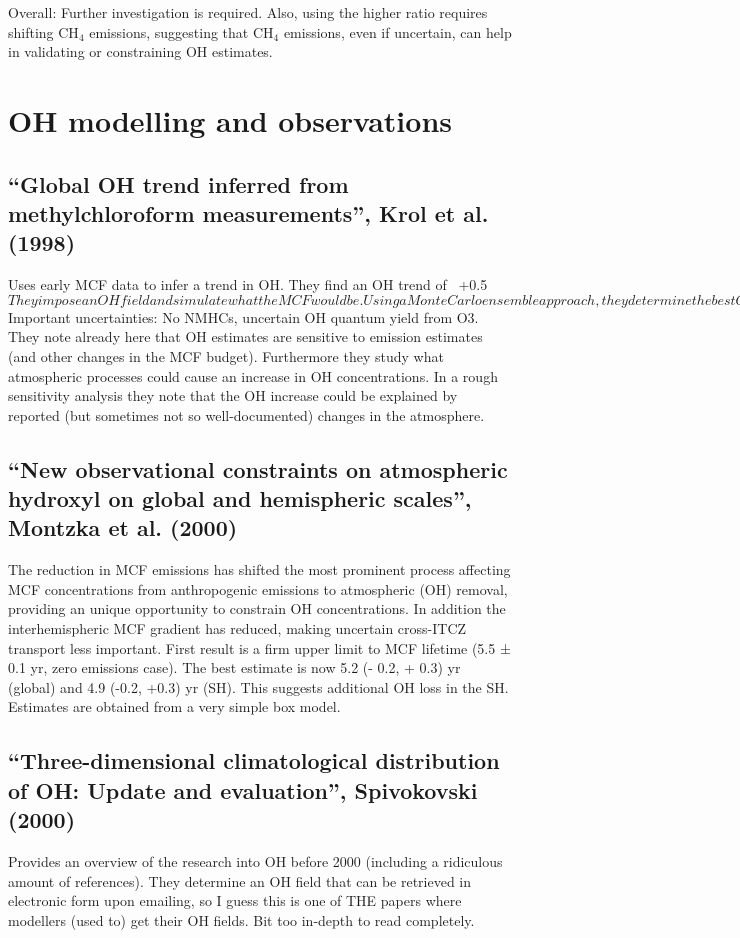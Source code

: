 Overall: Further investigation is required. Also, using the higher ratio requires shifting CH$_4$ emissions, suggesting that CH$_4$ emissions, even if uncertain, can help in validating or constraining OH estimates.

\section{OH modelling and observations}

\subsection{“Global OH trend inferred from methylchloroform measurements”, Krol et al. (1998)}
Uses early MCF data to infer a trend in OH. They find an OH trend of ~+0.5$%
They impose an OH field and simulate what the MCF would be. Using a Monte Carlo ensemble approach, they determine the best OH field. NOTE: Typical uncertainties in the generated OH field can be up to 25$%
Important uncertainties: No NMHCs, uncertain OH quantum yield from O3.
They note already here that OH estimates are sensitive to emission estimates (and other changes in the MCF budget). Furthermore they study what atmospheric processes could cause an increase in OH concentrations. In a rough sensitivity analysis they note that the OH increase could be explained by reported (but sometimes not so well-documented) changes in the atmosphere.

\subsection{“New observational constraints on atmospheric hydroxyl on global and hemispheric scales”, Montzka et al. (2000)}
The reduction in MCF emissions has shifted the most prominent process affecting MCF concentrations from anthropogenic emissions to atmospheric (OH) removal, providing an unique opportunity to constrain OH concentrations. In addition the interhemispheric MCF gradient has reduced, making uncertain cross-ITCZ transport less important. First result is a firm upper limit to MCF lifetime (5.5 ± 0.1 yr, zero emissions case). The best estimate is now 5.2 (- 0.2, + 0.3) yr (global) and 4.9 (-0.2, +0.3) yr (SH). This suggests additional OH loss in the SH. Estimates are obtained from a very simple box model.

\subsection{“Three-dimensional climatological distribution of OH: Update and evaluation”, Spivokovski (2000)}
Provides an overview of the research into OH before 2000 (including a ridiculous amount of references). They determine an OH field that can be retrieved in electronic form upon emailing, so I guess this is one of THE papers where modellers (used to) get their OH fields. Bit too in-depth to read completely.
